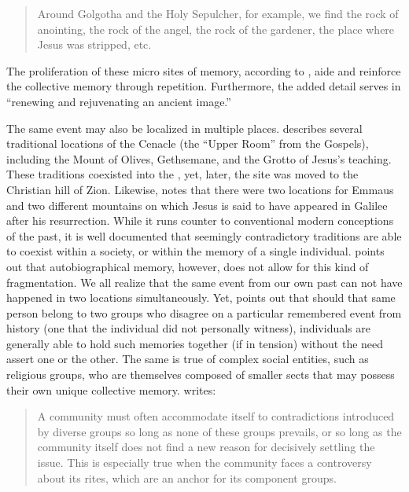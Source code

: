 \begin{quote}
    Around Golgotha and the Holy Sepulcher, for example, we find the rock of anointing, the rock of the angel, the rock of the gardener, the place where Jesus was stripped, etc.%
        \autocite[220]{halbwachs1992}
\end{quote}  
\noindent
The proliferation of these micro sites of memory, according to \halbwachs, aide and reinforce the collective memory through repetition. Furthermore, the added detail serves in ``renewing and rejuvenating an ancient image.''%
    \autocite[220]{halbwachs1992}  

The same event may also be localized in multiple places. \halbwachs describes several traditional locations of the Cenacle (the ``Upper Room'' from the Gospels), including the Mount of Olives, Gethsemane, and the Grotto of Jesus's teaching. These traditions coexisted into the , yet, later, the site was moved to the Christian hill of Zion. Likewise, \halbwachs notes that there were two locations for Emmaus and two different mountains on which Jesus is said to have appeared in Galilee after his resurrection. While it runs counter to conventional modern conceptions of the past, it is well documented that seemingly contradictory traditions are able to coexist within a society, or within the memory of a single individual.
\halbwachs points out that autobiographical memory, however, does not allow for this kind of fragmentation.
We all realize that the same event from our own past can not have happened in two locations simultaneously. Yet, \halbwachs points out that should that same person belong to two groups who disagree on a particular remembered event from history (one that the individual did not personally witness), individuals are generally able to hold such memories together (if in tension) without the need assert one or the other. The same is true of complex social entities, such as religious groups, who are themselves composed of smaller sects that may possess their own unique collective memory. \halbwachs writes:  

\begin{quote}
    A community must often accommodate itself to contradictions introduced by diverse groups so long as none of these groups prevails, or so long as the community itself does not find a new reason for decisively settling the issue. This is especially true when the community faces a controversy about its rites, which are an anchor for its component groups.%
        \autocite[224]{halbwachs1992}
\end{quote} 

